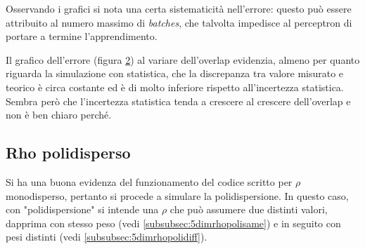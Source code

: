 \documentclass[a4paper,12pt,twoside,openright]{report}
\begin{document}
\begin{figure}[ht]
	\caption{}
	\label{fig:statn5rhomono}
\end{figure}
Osservando i grafici si nota una certa sistematicità nell'errore: questo può essere attribuito al numero massimo di \emph{batches}, che talvolta impedisce al perceptron di portare a termine l'apprendimento.

Il grafico dell'errore (figura \ref{fig:errorn5rhomono}) al variare dell'overlap evidenzia, almeno per quanto riguarda la simulazione con statistica, che la discrepanza tra valore misurato e teorico è circa costante ed è di molto inferiore rispetto all'incertezza statistica. Sembra però che l'incertezza statistica tenda a crescere al crescere dell'overlap e non è ben chiaro perché.
\begin{figure}[ht]
	\centering
	\caption{}
	\label{fig:errorn5rhomono}
\end{figure}



\subsection{Rho polidisperso}
\label{subsec:5dimrhopoli}
Si ha una buona evidenza del funzionamento del codice scritto per $ \rho $ monodisperso, pertanto si procede a simulare la polidispersione. In questo caso, con "polidispersione" si intende una $ \rho $ che può assumere due distinti valori, dapprima con stesso peso (vedi \ref{subsubsec:5dimrhopolisame}) e in seguito con pesi distinti (vedi \ref{subsubsec:5dimrhopolidiff}).
\end{document}
